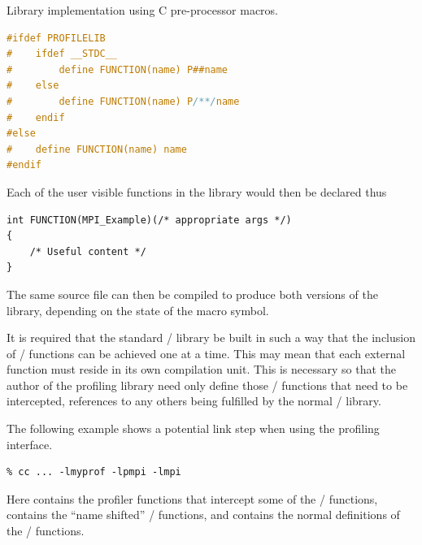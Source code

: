 \begin{example}
\label{exa:prof:macros}
Library implementation using C pre-processor macros.
\begin{lstlisting}[language=C]
#ifdef PROFILELIB
#    ifdef __STDC__
#        define FUNCTION(name) P##name
#    else
#        define FUNCTION(name) P/**/name
#    endif
#else
#    define FUNCTION(name) name
#endif
\end{lstlisting}

Each of the user visible functions in the library would then be declared
thus

\begin{lstlisting}[language={[MPI]C}]
int FUNCTION(MPI_Example)(/* appropriate args */)
{
    /* Useful content */
}
\end{lstlisting}

The same source file can then be compiled to produce both versions of the
library, depending on the state of the  macro symbol.
\end{example}

It is required that the standard \MPI/ library be built in such a way that
the inclusion of \MPI/ functions can be achieved one at a time.  This may mean that each external function must reside in its own compilation unit. This is
necessary so that the author of the profiling library need only define
those \MPI/ functions that need to be intercepted, references to any
others being fulfilled by the normal \MPI/ library.

\begin{example}
\label{exa:prof:linking}

	The following example shows a potential link step when using the profiling
	interface.

\begin{lstlisting}
% cc ... -lmyprof -lpmpi -lmpi
\end{lstlisting}

Here  contains the profiler functions that  intercept
some of the \MPI/ functions,  contains the ``name shifted''
\MPI/ functions, and  contains the normal definitions of the
\MPI/ functions.

\end{example}

